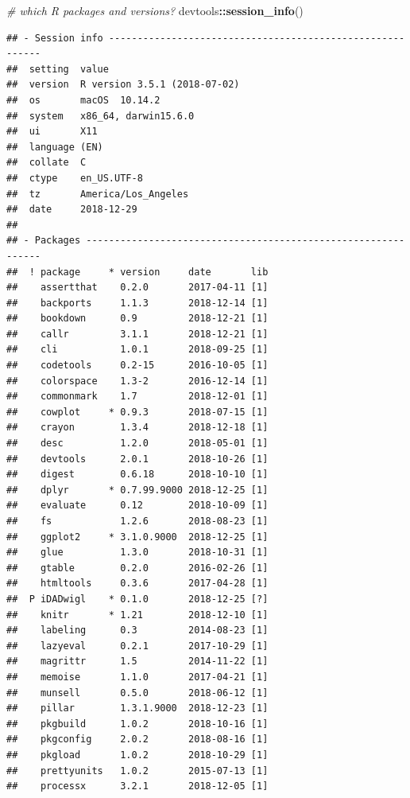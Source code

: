 \documentclass[]{elsarticle} %
\newenvironment{Shaded}{\begin{snugshade}}{\end{snugshade}}
\newcommand{\CommentTok}[1]{\textcolor[rgb]{0.56,0.35,0.01}{\textit{#1}}}
\newcommand{\KeywordTok}[1]{\textcolor[rgb]{0.13,0.29,0.53}{\textbf{#1}}}
\newcommand{\NormalTok}[1]{#1}
\newcommand{\OperatorTok}[1]{\textcolor[rgb]{0.81,0.36,0.00}{\textbf{#1}}}
\begin{document}
\begin{Shaded}
\begin{Highlighting}[]
\CommentTok{# which R packages and versions?}
\NormalTok{devtools}\OperatorTok{::}\KeywordTok{session_info}\NormalTok{()}
\end{Highlighting}
\end{Shaded}

\begin{verbatim}
## - Session info ----------------------------------------------------------
##  setting  value                       
##  version  R version 3.5.1 (2018-07-02)
##  os       macOS  10.14.2              
##  system   x86_64, darwin15.6.0        
##  ui       X11                         
##  language (EN)                        
##  collate  C                           
##  ctype    en_US.UTF-8                 
##  tz       America/Los_Angeles         
##  date     2018-12-29                  
## 
## - Packages --------------------------------------------------------------
##  ! package     * version     date       lib
##    assertthat    0.2.0       2017-04-11 [1]
##    backports     1.1.3       2018-12-14 [1]
##    bookdown      0.9         2018-12-21 [1]
##    callr         3.1.1       2018-12-21 [1]
##    cli           1.0.1       2018-09-25 [1]
##    codetools     0.2-15      2016-10-05 [1]
##    colorspace    1.3-2       2016-12-14 [1]
##    commonmark    1.7         2018-12-01 [1]
##    cowplot     * 0.9.3       2018-07-15 [1]
##    crayon        1.3.4       2018-12-18 [1]
##    desc          1.2.0       2018-05-01 [1]
##    devtools      2.0.1       2018-10-26 [1]
##    digest        0.6.18      2018-10-10 [1]
##    dplyr       * 0.7.99.9000 2018-12-25 [1]
##    evaluate      0.12        2018-10-09 [1]
##    fs            1.2.6       2018-08-23 [1]
##    ggplot2     * 3.1.0.9000  2018-12-25 [1]
##    glue          1.3.0       2018-10-31 [1]
##    gtable        0.2.0       2016-02-26 [1]
##    htmltools     0.3.6       2017-04-28 [1]
##  P iDADwigl    * 0.1.0       2018-12-25 [?]
##    knitr       * 1.21        2018-12-10 [1]
##    labeling      0.3         2014-08-23 [1]
##    lazyeval      0.2.1       2017-10-29 [1]
##    magrittr      1.5         2014-11-22 [1]
##    memoise       1.1.0       2017-04-21 [1]
##    munsell       0.5.0       2018-06-12 [1]
##    pillar        1.3.1.9000  2018-12-23 [1]
##    pkgbuild      1.0.2       2018-10-16 [1]
##    pkgconfig     2.0.2       2018-08-16 [1]
##    pkgload       1.0.2       2018-10-29 [1]
##    prettyunits   1.0.2       2015-07-13 [1]
##    processx      3.2.1       2018-12-05 [1]

\end{verbatim}
\end{document}
